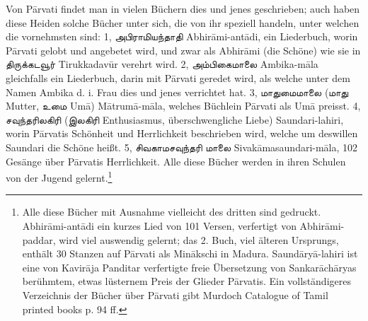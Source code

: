 \documentclass{article}
\newcommand{\TamilText}[1]{\texttamil{#1}}
\newcommand{\tam}[1]{\TamilText{#1}}
\begin{document}
Von P\={a}rvati findet man in vielen Büchern dies und jenes geschrieben; auch haben diese Heiden solche Bücher unter sich, die von ihr speziell handeln, unter welchen die vornehmsten sind: 1, \tam{அபிராமியந்தாதி} Abhir\={a}mi-ant\={a}di, ein Liederbuch, worin P\={a}rvati gelobt und angebetet wird, und zwar als Abhir\={a}mi (die Schöne) wie sie in \tam{திருக்கடவூர்} Tirukkadav\={u}r verehrt wird. 2, \tam{அம்பிகைமாலை} Ambika-m\={a}la gleichfalls ein Liederbuch, darin mit P\={a}rvati geredet wird, als welche unter dem Namen Ambika d. i. Frau dies und jenes verrichtet hat. 3, \tam{மாதுமைமாலை} (\tam{மாது} Mutter, \tam{உமை} Um\={a}) M\={a}trum\={a}-m\={a}la, welches Büchlein P\={a}rvati als Um\={a} preisst. 4, \tam{சவுந்தரிலகிரி} (\tam{இலகிரி} Enthusiasmus, überschwengliche Liebe) Saundari-lahiri, worin P\={a}rvatis Schönheit und Herrlichkeit beschrieben wird, welche um deswillen Saundari die Schöne heißt. 5, \tam{சிவகாமசவுந்தரி} \tam{மாலை} Sivak\={a}masaundari-m\={a}la, 102 Gesänge über P\={a}rvatis Herrlichkeit. Alle diese Bücher werden in ihren Schulen von der Jugend gelernt.\footnote{Alle diese Bücher mit Ausnahme vielleicht des dritten sind gedruckt. Abhir\={a}mi-ant\={a}di ein kurzes Lied von 101 Versen, verfertigt von Abhir\={a}mi-paddar, wird viel auswendig gelernt; das 2. Buch, viel älteren Ursprungs, enthält 30 Stanzen auf P\={a}rvati als Min\={a}kschi in Madura. Saund\={a}ry\={a}-lahiri ist eine von Kavir\={a}ja Panditar verfertigte freie Übersetzung von Sankar\={a}ch\={a}ryas berühmtem, etwas lüsternem Preis der Glieder P\={a}rvatis. Ein vollständigeres Verzeichnis der Bücher über P\={a}rvati gibt Murdoch Catalogue of Tamil printed books p. 94 ff.}
\end{document}
